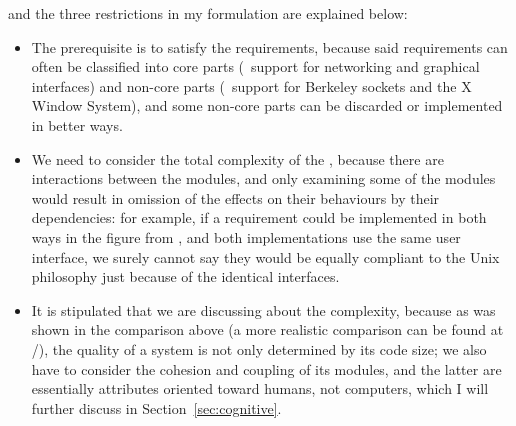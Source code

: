 and the three restrictions in my formulation are explained below:
\begin{itemize}
\item The prerequisite is to  satisfy the requirements,
	because said requirements can often be classified into core parts
	(\eg~support for networking and graphical interfaces) and non-core
	parts (\eg~support for Berkeley sockets and the X Window System),
	and some non-core parts can be discarded or implemented in better ways.
\item We need to consider the total complexity of the , because
	there are interactions between the modules, and only examining some of the
	modules would result in omission of the effects on their behaviours by
	their dependencies: for example, if a requirement could be implemented in	
	both ways in the figure from \parencite{litt2014a}, and both implementations
	use the same user interface, we surely cannot say they would be equally
	compliant to the Unix philosophy just because of the identical interfaces.
\item It is stipulated that we are discussing about the 
	complexity, because as was shown in the comparison above (a more realistic
	comparison can be found at \parencite{github:acmetiny}/\parencite%
	{gitea:emca}), the quality of a system is not only determined by its code
	size; we also have to consider the cohesion and coupling of its modules,
	and the latter are essentially attributes oriented toward humans, not
	computers, which I will further discuss in Section~\ref{sec:cognitive}.
\end{itemize}

